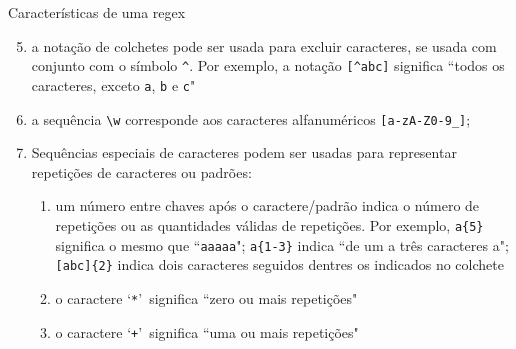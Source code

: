 \begin{frame}[fragile]{Características de uma regex}

    \begin{enumerate}
        \setcounter{enumi}{4}

        \item a notação de colchetes pode ser usada para excluir caracteres, se usada com conjunto com o símbolo \verb|^|. Por exemplo, a notação \verb|[^abc]| significa ``todos os caracteres, exceto \texttt{a}, \texttt{b} e \texttt{c}"
        \item a sequência \verb|\w| corresponde aos caracteres alfanuméricos \verb|[a-zA-Z0-9_]|;
        \item Sequências especiais de caracteres podem ser usadas para representar repetições de caracteres ou padrões:
        \begin{enumerate}
            \item um número entre chaves após o caractere/padrão indica o número de repetições ou 
                as quantidades válidas de repetições. Por exemplo, \verb|a{5}| significa o mesmo 
                que ``\texttt{aaaaa}"; \verb|a{1-3}| indica ``de um a três caracteres a"; 
                \verb|[abc]{2}| indica dois caracteres seguidos dentres os indicados no colchete
            \item o caractere \lq \verb|*|\rq\ significa ``zero ou mais repetições"
            \item o caractere \lq \verb|+|\rq\ significa ``uma ou mais repetições"

        \end{enumerate}
    \end{enumerate}

\end{frame}

